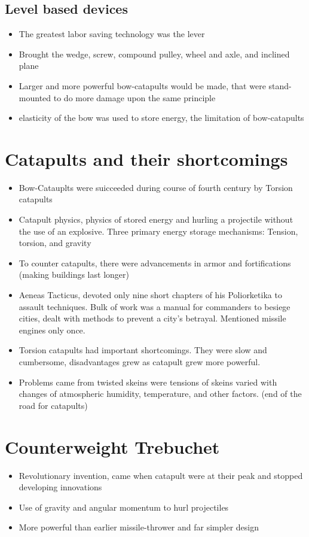 \documentclass{article}
\begin{document}
\subsection{Level based devices}
\begin{itemize}
  \item The greatest labor saving technology was the lever
  \item Brought the wedge, screw, compound pulley, wheel and axle, and inclined plane
  \item Larger and more powerful bow-catapults would be made, that
    were stand-mounted to do more damage upon the same principle
  \item elasticity of the bow was used to store energy,
    the limitation of bow-catapults
\end{itemize}

\section*{Catapults and their shortcomings}
\begin{itemize}
  \item Bow-Catauplts were suicceeded during course of fourth century by Torsion catapults
  \item Catapult physics, physics of stored energy and hurling a projectile without
    the use of an explosive. Three primary energy storage mechanisms:
    Tension, torsion, and gravity
  \item To counter catapults, there were advancements in armor and fortifications (making buildings last longer)
  \item Aeneas Tacticus, devoted only nine short chapters of his Poliorketika
    to assault techniques. Bulk of work was a manual for commanders to besiege cities, dealt with
    methods to prevent a city's betrayal. Mentioned missile engines only once.
  \item Torsion catapults had important shortcomings. They were slow and cumbersome,
    disadvantages grew as catapult grew more powerful.
  \item Problems came from twisted skeins were tensions of skeins varied with changes
    of atmospheric humidity, temperature, and other factors. (end of the road for catapults)
\end{itemize}

\section*{Counterweight Trebuchet}
\begin{itemize}
  \item Revolutionary invention, came when catapult were at their peak
    and stopped developing innovations
  \item Use of gravity and angular momentum to hurl projectiles
  \item More powerful than earlier missile-thrower and far simpler design
\end{itemize}
\end{document}
